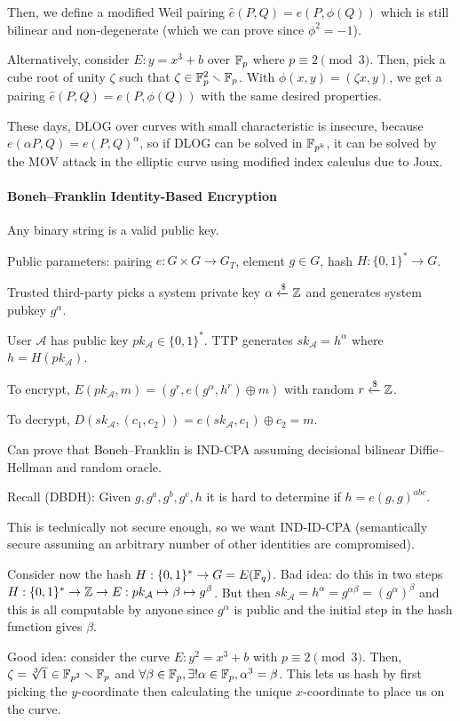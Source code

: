 \documentclass[notes]{agony}
\newcommand{\xgets}{\xleftarrow}
\newcommand{\ndgets}{\xgets{\mathdollar}}
\begin{document}
Then, we define a modified Weil pairing $\hat e(P,Q) = e(P,\phi(Q))$
which is still bilinear and non-degenerate (which we can prove since $\phi^2 = -1$).

Alternatively, consider $E : y = x^3 + b$ over $\mathbb{F}_p$ where $p \equiv 2 \pmod 3$.
Then, pick a cube root of unity $\zeta$ such that $\zeta \in \mathbb{F}_p^2 \smallsetminus \mathbb{F}_p$.
With $\phi(x,y) = (\zeta x,y)$, we get a pairing $\hat e(P,Q) = e(P,\phi(Q))$
with the same desired properties.

These days, DLOG over curves with small characteristic is insecure,
because $e(\alpha P,Q) = e(P,Q)^\alpha$, so if DLOG can be solved in $\mathbb{F}_{p^k}$,
it can be solved by the MOV attack in the elliptic curve using modified index calculus due to Joux.

\paragraph{Boneh--Franklin Identity-Based Encryption}
Any binary string is a valid public key.

Public parameters: pairing $e : G \times G \to G_T$, element $g \in G$, 
hash $H : \{0,1\}^* \to G$.

Trusted third-party picks a system private key $\alpha \ndgets\Z$
and generates system pubkey $g^\alpha$.

User $\mathcal A$ has public key $pk_{\mathcal A} \in \{0,1\}^*$.
TTP generates $sk_{\mathcal A} = h^\alpha$ where $h = H(pk_{\mathcal A})$.

To encrypt, $E(pk_{\mathcal A}, m) = (g^r, e(g^\alpha, h^r) \oplus m)$ with random $r \ndgets \Z$.

To decrypt, $D(sk_{\mathcal A}, (c_1, c_2)) = e(sk_{\mathcal A}, c_1) \oplus c_2 = m$.

Can prove that Boneh--Franklin is IND-CPA
assuming decisional bilinear Diffie--Hellman and random oracle.

Recall (DBDH): Given $g,g^a,g^b,g^c,h$ it is hard to determine if $h = e(g,g)^{abc}$.

This is technically not secure enough, so we want IND-ID-CPA
(semantically secure assuming an arbitrary number of other identities are compromised).

Consider now the hash $H : \{0,1\}^* \to G = E(\mathbb{F}_q)$.
Bad idea: do this in two steps $H: \{0,1\}^* \to \mathbb{Z} \to E: pk_{\mathcal A} \mapsto \beta \mapsto g^\beta$.
But then $sk_{\mathcal A} = h^\alpha = g^{\alpha\beta} = (g^\alpha)^\beta$
and this is all computable by anyone since $g^\alpha$ is public
and the initial step in the hash function gives $\beta$.

Good idea: consider the curve $E : y^2 = x^3 + b$ with $p \equiv 2 \pmod 3$.
Then, $\zeta = \sqrt[3]{1} \in \mathbb{F}_{p^2} \smallsetminus \mathbb{F}_p$
and $\forall \beta \in \mathbb{F}_p, \exists! \alpha \in \mathbb{F}_p, \alpha^3 = \beta$.
This lets us hash by first picking the $y$-coordinate
then calculating the unique $x$-coordinate to place us on the curve.
\end{document}
